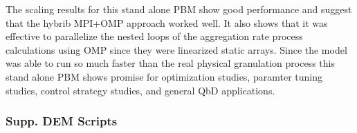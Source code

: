 The scaling results for this stand alone PBM show good performance and suggest that the hybrib MPI+OMP approach worked well. It also shows that it was effective to parallelize the nested loops of the aggregation rate process calculations using OMP since they were linearized static arrays. Since the model was able to run so much faster than the real physical granulation process this stand alone PBM shows promise for optimization studies, paramter tuning studies, control strategy studies, and general QbD applications.


\subsubsection{Supp. DEM Scripts}

